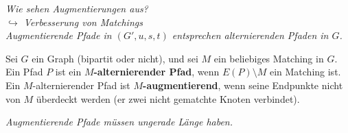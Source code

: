 \textit{Wie sehen Augmentierungen aus?\\
\hspace*{10pt}$\hookrightarrow$ Verbesserung von Matchings\\
Augmentierende Pfade in $(G',u,s,t)$ entsprechen alternierenden Pfaden in $G$.}
\begin{definition}
	Sei $G$ ein Graph (bipartit oder nicht), und sei $M$ ein beliebiges Matching in $G$. Ein Pfad $P$ ist ein \textbf{$M$-alternierender Pfad}, wenn $E(P)\setminus M$ ein Matching ist. Ein $M$-alternierender Pfad ist \textbf{$M$-augmentierend}, wenn seine Endpunkte nicht von $M$ überdeckt werden (er zwei nicht gematchte Knoten verbindet).
\end{definition}
\textit{Augmentierende Pfade müssen ungerade Länge haben.}
